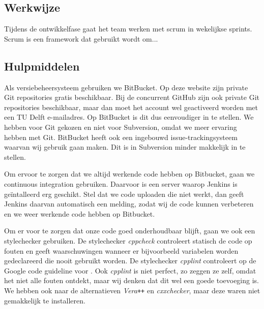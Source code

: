 \subsection{Werkwijze}
Tijdens de ontwikkelfase gaat het team werken met scrum in wekelijkse sprints. Scrum is een framework dat gebruikt wordt om...

\subsection{Hulpmiddelen}
Als versiebeheersysteem gebruiken we BitBucket. Op deze website zijn private Git repositories gratis beschikbaar. Bij de concurrent GitHub zijn ook private Git repositories beschikbaar, maar dan moet het account wel geactiveerd worden met een TU Delft e-mailadres. Op BitBucket is dit dus eenvoudiger in te stellen. We hebben voor Git gekozen en niet voor Subversion, omdat we meer ervaring hebben met Git. BitBucket heeft ook een ingebouwd issue-trackingsysteem waarvan wij gebruik gaan maken. Dit is in Subversion minder makkelijk in te stellen.

Om ervoor te zorgen dat we altijd werkende code hebben op Bitbucket, gaan we continuous integration gebruiken. Daarvoor is een server waarop Jenkins is ge\"intalleerd erg geschikt. Stel dat we code uploaden die niet werkt, dan geeft Jenkins daarvan automatisch een melding, zodat wij de code kunnen verbeteren en we weer werkende code hebben op Bitbucket.  

Om er voor te zorgen dat onze code goed onderhoudbaar blijft, gaan we ook een stylechecker gebruiken. De stylechecker \emph{cppcheck} controleert statisch de code op fouten en geeft waarschuwingen wanneer er bijvoorbeeld variabelen worden gedeclareerd die nooit gebruikt worden. De stylechecker \emph{cpplint} controleert op de Google code guideline voor \cpp. Ook \emph{cpplint} is niet perfect, zo zeggen ze zelf, omdat het niet alle fouten ontdekt, maar wij denken dat dit wel een goede toevoeging is. We hebben ook naar de alternatieven \emph{Vera\texttt{++}} en \emph{cxxchecker}, maar deze waren niet gemakkelijk te installeren.

